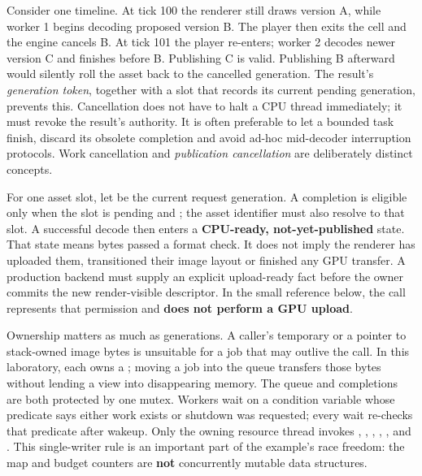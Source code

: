 Consider one timeline. At tick 100 the renderer still draws version A, while worker 1 begins decoding proposed version B. The player then exits the cell and the engine cancels B. At tick 101 the player re-enters; worker 2 decodes newer version C and finishes before B. Publishing C is valid. Publishing B afterward would silently roll the asset back to the cancelled generation. The result's \emph{generation token}, together with a slot that records its current pending generation, prevents this. Cancellation does not have to halt a CPU thread immediately; it must revoke the result's authority. It is often preferable to let a bounded task finish, discard its obsolete completion and avoid ad-hoc mid-decoder interruption protocols. Work cancellation and \emph{publication cancellation} are deliberately distinct concepts.

For one asset slot, let  be the current request generation. A completion  is eligible only when the slot is pending and ; the asset identifier must also resolve to that slot. A successful decode then enters a \textbf{CPU-ready, not-yet-published} state. That state means bytes passed a format check. It does not imply the renderer has uploaded them, transitioned their image layout or finished any GPU transfer. A production backend must supply an explicit upload-ready fact before the owner commits the new render-visible descriptor. In the small reference below, the  call represents that permission and \textbf{does not perform a GPU upload}.

Ownership matters as much as generations. A caller's temporary  or a pointer to stack-owned image bytes is unsuitable for a job that may outlive the call. In this laboratory, each  owns a ; moving a job into the queue transfers those bytes without lending a view into disappearing memory. The queue and completions are both protected by one mutex. Workers wait on a condition variable whose predicate says either work exists or shutdown was requested; every wait re-checks that predicate after wakeup. Only the owning resource thread invokes , , , , ,  and . This single-writer rule is an important part of the example's race freedom: the map and budget counters are \textbf{not} concurrently mutable data structures.

